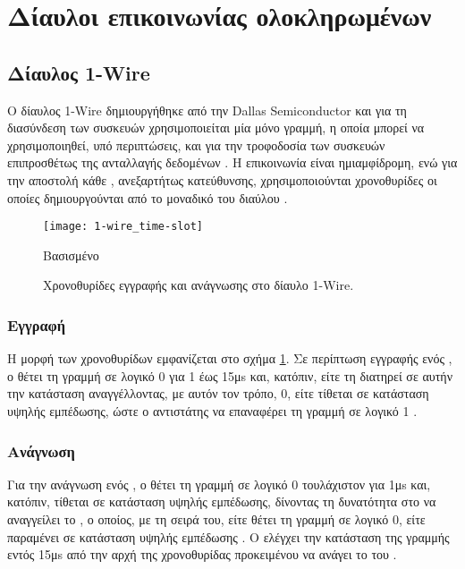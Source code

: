 \section{Δίαυλοι επικοινωνίας ολοκληρωμένων}

\subsection{Δίαυλος 1-Wire}
\label{subsec:1-wire}

Ο δίαυλος 1-Wire δημιουργήθηκε από την Dallas Semiconductor και για τη
διασύνδεση των συσκευών χρησιμοποιείται μία μόνο γραμμή, η οποία μπορεί να
χρησιμοποιηθεί, υπό περιπτώσεις, και για την τροφοδοσία των συσκευών
επιπροσθέτως της ανταλλαγής δεδομένων \parencite[1]{atmel04}. Η επικοινωνία
είναι ημιαμφίδρομη, ενώ για την αποστολή κάθε , ανεξαρτήτως κατεύθυνσης,
χρησιμοποιούνται χρονοθυρίδες οι οποίες δημιουργούνται από το μοναδικό
 του διαύλου \parencites[2]{atmel04}[15]{ds18b20}.

\begin{figure}
    \caption{Χρονοθυρίδες εγγραφής και ανάγνωσης στο δίαυλο 1-Wire.
    \label{fig:1-wire:time-slot}}
    \begin{center}
    \texttt{[image: 1-wire\_time-slot]}
    \end{center}
    Βασισμένο 
\end{figure}


\subsubsection{Εγγραφή}

Η μορφή των χρονοθυρίδων εμφανίζεται στο σχήμα \ref{fig:1-wire:time-slot}. Σε
περίπτωση εγγραφής ενός , ο  θέτει τη γραμμή σε λογικό 0 για
1 έως 15μs και, κατόπιν, είτε τη διατηρεί σε αυτήν την κατάσταση αναγγέλλοντας,
με αυτόν τον τρόπο,  0, είτε τίθεται σε κατάσταση υψηλής εμπέδωσης, ώστε
ο αντιστάτης  να επαναφέρει τη γραμμή σε λογικό 1
\parencite[2]{atmel04}.


\subsubsection{Ανάγνωση}

Για την ανάγνωση ενός , ο  θέτει τη γραμμή σε λογικό 0
τουλάχιστον για 1μs και, κατόπιν, τίθεται σε κατάσταση υψηλής εμπέδωσης,
δίνοντας τη δυνατότητα στο  να αναγγείλει το , ο οποίος, με τη
σειρά του, είτε θέτει τη γραμμή σε λογικό 0, είτε παραμένει σε κατάσταση υψηλής
εμπέδωσης \parencite[2]{atmel04}. Ο  ελέγχει την κατάσταση της
γραμμής εντός 15μs από την αρχή της χρονοθυρίδας \parencite[17]{ds18b20}
προκειμένου να ανάγει το  του .

